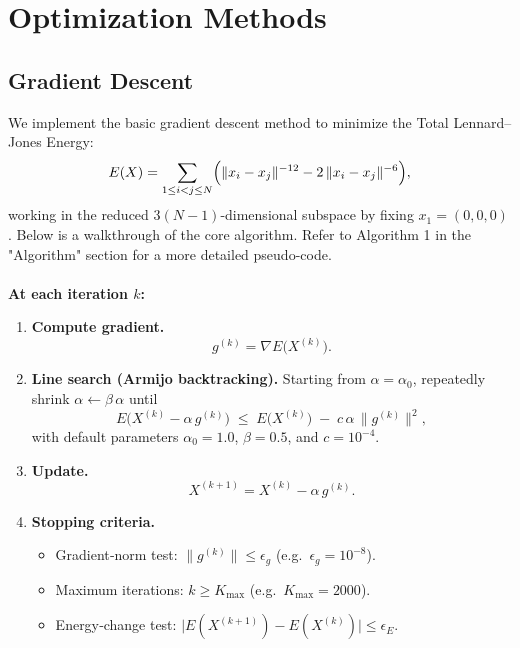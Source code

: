 \documentclass[11pt,onecolumn]{article}
\begin{document}
\section{Optimization Methods}

\subsection{Gradient Descent}
We implement the basic gradient descent method to minimize the Total Lennard–Jones Energy:
\[
  E(X) = \sum_{1\le i<j\le N} \Bigl(\|x_i - x_j\|^{-12} - 2\,\|x_i - x_j\|^{-6}\Bigr),
\]
working in the reduced \(3(N-1)\)-dimensional subspace by fixing \(x_1=(0,0,0)\). Below is a walkthrough of the core algorithm. Refer to Algorithm 1 in the "Algorithm" section for a more detailed pseudo-code.\\\\
\textbf {At each iteration \(k\):}

\begin{enumerate}
  \item \textbf{Compute gradient.}  
    \[
      g^{(k)} = \nabla E\bigl(X^{(k)}\bigr).
    \]
  \item \textbf{Line search (Armijo backtracking).}  Starting from \(\alpha = \alpha_0\), repeatedly shrink
    \(\alpha \leftarrow \beta\,\alpha\) until
    \[
      E\bigl(X^{(k)} - \alpha\,g^{(k)}\bigr)
      \;\le\;
      E\bigl(X^{(k)}\bigr)
      \;-\;
      c\,\alpha\,\|g^{(k)}\|^2,
    \]
    with default parameters \(\alpha_0=1.0\), \(\beta=0.5\), and \(c=10^{-4}\).
  \item \textbf{Update.}  
    \[
      X^{(k+1)} = X^{(k)} - \alpha\,g^{(k)}.
    \]
  \item \textbf{Stopping criteria.}
    \begin{itemize}
      \item {Gradient‐norm test:} \(\|g^{(k)}\|\le \epsilon_g\) (e.g.\ \(\epsilon_g=10^{-8}\)).
      \item {Maximum iterations:} \(k\ge K_{\max}\) (e.g.\ \(K_{\max}=2000\)).
      \item {Energy‐change test:} 
        \(\bigl|E(X^{(k+1)}) - E(X^{(k)})\bigr|\le\epsilon_E\).
    \end{itemize}
\end{enumerate}
\end{document}
